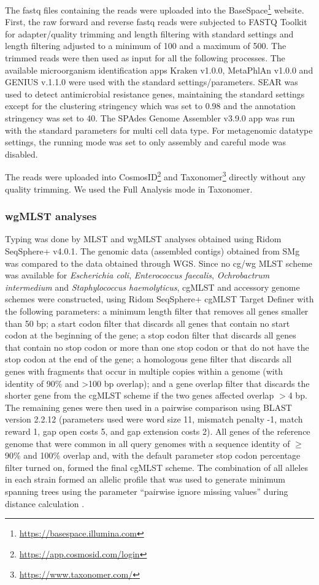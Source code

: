 The fastq files containing the reads were uploaded into the BaseSpace\footnote{\url{https://basespace.illumina.com}} website. 
First, the raw forward and reverse fastq reads were subjected to FASTQ Toolkit for adapter/quality trimming and length filtering with standard settings and length filtering adjusted to a minimum of 100 and a maximum of 500. 
The trimmed reads were then used as input for all the following processes. 
The available microorganism identification apps Kraken v1.0.0, MetaPhlAn v1.0.0 and GENIUS v.1.1.0 were used with the standard settings/parameters.
SEAR was used to detect antimicrobial resistance genes, maintaining the standard settings except for the clustering stringency which was set to 0.98 and the annotation stringency was set to 40.
The SPAdes Genome Assembler v3.9.0 app was run with the standard parameters for multi cell data type. 
For metagenomic datatype settings, the running mode was set to only assembly and careful mode was disabled. 

The reads were uploaded into CosmosID\footnote{\url{https://app.cosmosid.com/login}} and Taxonomer\footnote{\url{https://www.taxonomer.com/}} \citep{flygare_taxonomer_2016} directly without any quality trimming. 
We used the Full Analysis mode in Taxonomer.

\subsubsection{wgMLST analyses}

Typing was done by MLST and wgMLST analyses obtained using Ridom SeqSphere+ v4.0.1. 
The genomic data (assembled contigs) obtained from \ac{SMg} was compared to the data obtained through \ac{WGS}.
Since no cg/wg MLST scheme was available for \textit{Escherichia coli}, \textit{Enterococcus faecalis}, \textit{Ochrobactrum intermedium} and \textit{Staphylococcus haemolyticus}, cgMLST and accessory genome schemes were constructed, using Ridom SeqSphere+ cgMLST Target Definer with the following parameters: a minimum length filter that removes all genes smaller than 50 bp; a start codon filter that discards all genes that contain no start codon at the beginning of the gene; a stop codon filter that discards all genes that contain no stop codon or more than one stop codon or that do not have the stop codon at the end of the gene; a homologous gene filter that discards all genes with fragments that occur in multiple copies within a genome (with identity of 90\% and >100 bp overlap); and a gene overlap filter that discards the shorter gene from the cgMLST scheme if the two genes affected overlap $>$4 bp. 
The remaining genes were then used in a pairwise comparison using BLAST version 2.2.12 (parameters used were word size 11, mismatch penalty -1, match reward 1, gap open costs 5, and gap extension costs 2). 
All genes of the reference genome that were common in all query genomes with a sequence identity of $\geq$ 90\% and 100\% overlap and, with the default parameter stop codon percentage filter turned on, formed the final cgMLST scheme. 
The combination of all alleles in each strain formed an allelic profile that was used to generate minimum spanning trees using the parameter “pairwise ignore missing values” during distance calculation \citep{ruppitsch_defining_2015}.

